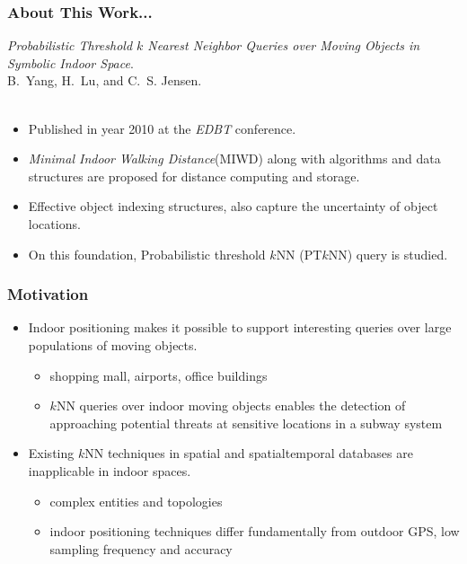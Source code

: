 \begin{frame}
\frametitle{About This Work...}

\emph{Probabilistic Threshold $k$ Nearest Neighbor Queries over Moving Objects in Symbolic Indoor Space}.~\cite{DBLP:conf/edbt/YangLJ10} \\
B.~Yang, H.~Lu, and C.~S. Jensen.\\~\\

\begin{itemize}
  \item Published in year 2010 at the \emph{EDBT} conference.
  \item \emph{Minimal Indoor Walking Distance}(MIWD) along with algorithms and data structures are proposed for distance computing and storage.
  \item Effective object indexing structures, also capture the uncertainty of object locations.
  \item On this foundation, Probabilistic threshold $k$NN (PT$k$NN) query is studied.
\end{itemize}

\end{frame}

\begin{frame}
\frametitle{Motivation}

\begin{itemize}
  \item Indoor positioning makes it possible to support interesting queries over large populations of moving objects.
    \begin{itemize}
      \item shopping mall, airports, office buildings
      \item $k$NN queries over indoor moving objects enables the detection of approaching potential threats at sensitive locations in a subway system
    \end{itemize}

  \item Existing $k$NN techniques in spatial and spatialtemporal databases are inapplicable in indoor spaces.
    \begin{itemize}
      \item complex entities and topologies
      \item indoor positioning techniques differ fundamentally from outdoor GPS, low sampling frequency and accuracy
    \end{itemize}
\end{itemize}

\end{frame}

